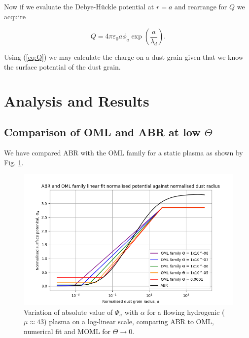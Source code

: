 \documentclass[journal]{Imperial_lab_report}
\begin{document}
Now if we evaluate the Debye-Hückle potential at $r = a$ and rearrange for $Q$ we acquire

\begin{equation}\label{eq:Q}
Q = 4 \pi \varepsilon_0 a \phi_ a  \exp{\left(\frac{a}{\lambda_d}\right)}.
\end{equation}

Using (\ref{eq:Q}) we may calculate the charge on a dust grain given that we know the surface potential of the dust grain. 

\section{Analysis and Results}

\medskip

\subsection{Comparison of OML and ABR at low $\Theta$}

\medskip

We have compared ABR with the OML family for a static plasma as shown by Fig. \ref{OMLvsABR}.

\begin{figure}[H]
\centering
\includegraphics[width=\linewidth]{Output/OMLvsABR.jpeg}
\caption{Variation of absolute value of $\Phi_a$ with $\alpha$ for a flowing hydrogenic ($\mu \approx 43$) plasma on a log-linear scale, comparing ABR to OML, numerical fit and MOML for $\Theta \xrightarrow{} 0$.}
\label{OMLvsABR} 
\end{figure}
\end{document}
